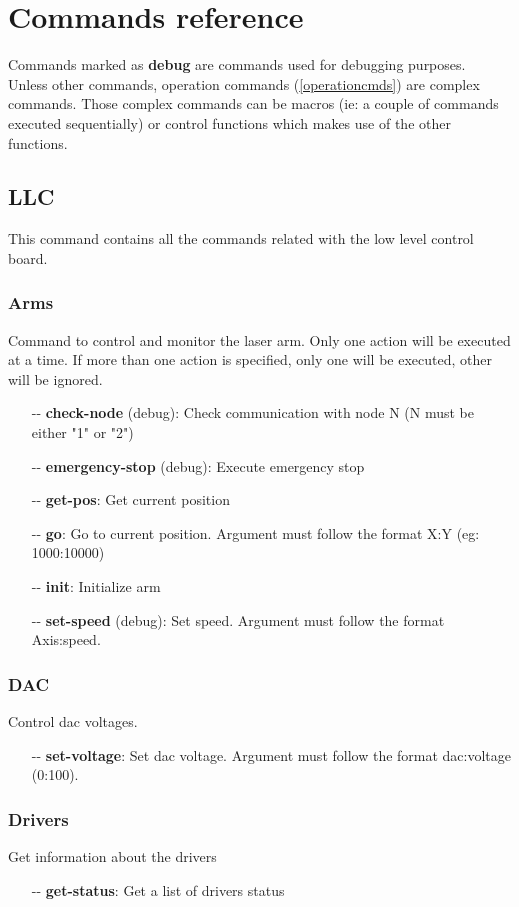 \documentclass[letterpaper, 10 pt]{article}
\begin{document}
\section{Commands reference}
Commands marked as \textbf{debug} are commands used for debugging purposes.\\
\linebreak
Unless other commands, operation commands (\ref{operationcmds}) are complex commands. Those complex commands can be macros (ie: a couple of commands executed sequentially) or control functions which makes use of the other functions.
\subsection{LLC}
This command contains all the commands related with the low level control board.
\subsubsection{Arms}
Command to control and monitor the laser arm. Only one action will be executed at a time. If more than one action is specified, only one will be executed, other will be ignored.
\begin{itemize}
	\item[-{}-] \textbf{check-node} (debug): Check communication with node N (N must be either "1" or "2")
	\item[-{}-] \textbf{emergency-stop} (debug): Execute emergency stop
	\item[-{}-] \textbf{get-pos}: Get current position
	\item[-{}-] \textbf{go}: Go to current position. Argument must follow the format X:Y (eg: 1000:10000)
	\item[-{}-] \textbf{init}: Initialize arm
	\item[-{}-] \textbf{set-speed} (debug): Set speed. Argument must follow the format Axis:speed.
\end{itemize}
\subsubsection{DAC}
Control dac voltages.
\begin{itemize}
	\item[-{}-] \textbf{set-voltage}: Set dac voltage. Argument must follow the format dac:voltage (0:100).
\end{itemize}

\subsubsection{Drivers}
Get information about the drivers
\begin{itemize}
	\item[-{}-] \textbf{get-status}: Get a list of drivers status
\end{itemize}
\end{document}
